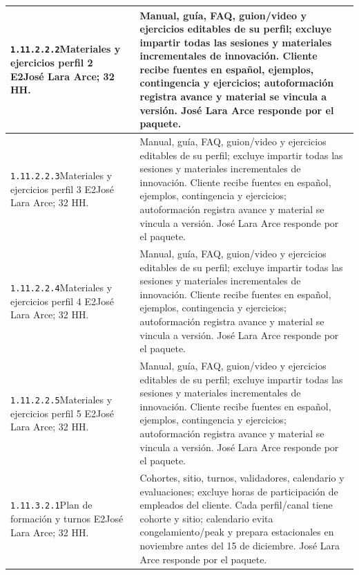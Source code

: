 \begin{longtable}{L{52mm}L{91mm}}
\texttt{1.\allowbreak{}11.\allowbreak{}2.\allowbreak{}2.\allowbreak{}2}\newline Materiales y ejercicios perfil 2 E2\newline José Lara Arce; 32 HH. & Manual, guía, FAQ, guion/video y ejercicios editables de su perfil; excluye impartir todas las sesiones y materiales incrementales de innovación. Cliente recibe fuentes en español, ejemplos, contingencia y ejercicios; autoformación registra avance y material se vincula a versión. José Lara Arce responde por el paquete.\\\hline
\texttt{1.\allowbreak{}11.\allowbreak{}2.\allowbreak{}2.\allowbreak{}3}\newline Materiales y ejercicios perfil 3 E2\newline José Lara Arce; 32 HH. & Manual, guía, FAQ, guion/video y ejercicios editables de su perfil; excluye impartir todas las sesiones y materiales incrementales de innovación. Cliente recibe fuentes en español, ejemplos, contingencia y ejercicios; autoformación registra avance y material se vincula a versión. José Lara Arce responde por el paquete.\\\hline
\texttt{1.\allowbreak{}11.\allowbreak{}2.\allowbreak{}2.\allowbreak{}4}\newline Materiales y ejercicios perfil 4 E2\newline José Lara Arce; 32 HH. & Manual, guía, FAQ, guion/video y ejercicios editables de su perfil; excluye impartir todas las sesiones y materiales incrementales de innovación. Cliente recibe fuentes en español, ejemplos, contingencia y ejercicios; autoformación registra avance y material se vincula a versión. José Lara Arce responde por el paquete.\\\hline
\texttt{1.\allowbreak{}11.\allowbreak{}2.\allowbreak{}2.\allowbreak{}5}\newline Materiales y ejercicios perfil 5 E2\newline José Lara Arce; 32 HH. & Manual, guía, FAQ, guion/video y ejercicios editables de su perfil; excluye impartir todas las sesiones y materiales incrementales de innovación. Cliente recibe fuentes en español, ejemplos, contingencia y ejercicios; autoformación registra avance y material se vincula a versión. José Lara Arce responde por el paquete.\\\hline
\texttt{1.\allowbreak{}11.\allowbreak{}3.\allowbreak{}2.\allowbreak{}1}\newline Plan de formación y turnos E2\newline José Lara Arce; 32 HH. & Cohortes, sitio, turnos, validadores, calendario y evaluaciones; excluye horas de participación de empleados del cliente. Cada perfil/canal tiene cohorte y sitio; calendario evita congelamiento/peak y prepara estacionales en noviembre antes del 15 de diciembre. José Lara Arce responde por el paquete.\\\hline

\end{longtable}
